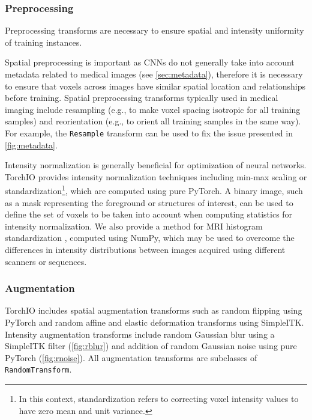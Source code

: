 \subsubsection{Preprocessing}

Preprocessing transforms are necessary to ensure spatial and intensity uniformity of training instances.

Spatial preprocessing is important as \acp{CNN} do not generally take into account metadata related to medical images (see \cref{sec:metadata}), therefore it is necessary to ensure that voxels across images have similar spatial location and relationships before training.
Spatial preprocessing transforms typically used in medical imaging include resampling (e.g., to make voxel spacing isotropic for all training samples) and reorientation (e.g., to orient all training samples in the same way).
For example, the \texttt{Resample} transform can be used to fix the issue presented in \cref{fig:metadata}.

Intensity normalization is generally beneficial for optimization of neural networks.
TorchIO provides intensity normalization techniques including min-max scaling or standardization\footnote{In this context, standardization refers to correcting voxel intensity values to have zero mean and unit variance.}, which are computed using pure PyTorch.
A binary image, such as a mask representing the foreground or structures of interest, can be used to define the set of voxels to be taken into account when computing statistics for intensity normalization.
We also provide a method for \ac{MRI} histogram standardization \cite{nyul_new_2000}, computed using NumPy, which may be used to overcome the differences in intensity distributions between images acquired using different scanners or sequences.




\subsubsection{Augmentation}

TorchIO includes spatial augmentation transforms such as random flipping using PyTorch and random affine and elastic deformation transforms using SimpleITK.
Intensity augmentation transforms include random Gaussian blur using a SimpleITK filter (\cref{fig:rblur}) and addition of random Gaussian noise using pure PyTorch (\cref{fig:rnoise}).
All augmentation transforms are subclasses of \texttt{RandomTransform}.

